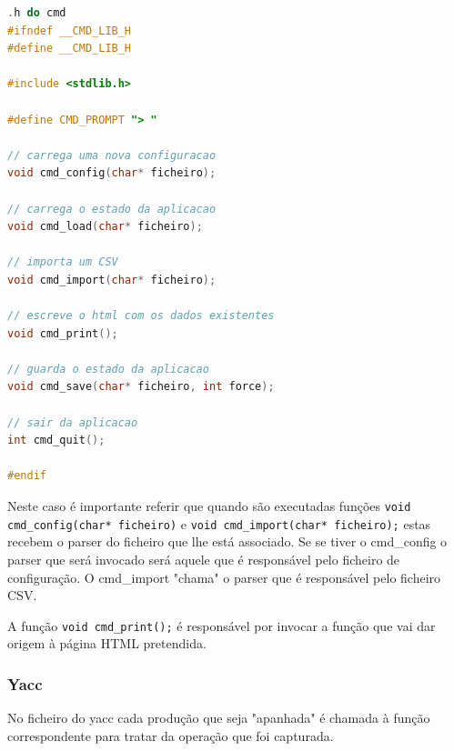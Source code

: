 \documentclass[11pt, a4paper, oneside]{article}
\begin{document}
\begin{lstlisting}[language=C, caption={Ações semânticas do módulo.}]
.h do cmd
#ifndef __CMD_LIB_H
#define __CMD_LIB_H

#include <stdlib.h>

#define CMD_PROMPT "> "

// carrega uma nova configuracao
void cmd_config(char* ficheiro);

// carrega o estado da aplicacao
void cmd_load(char* ficheiro);

// importa um CSV
void cmd_import(char* ficheiro);

// escreve o html com os dados existentes
void cmd_print();

// guarda o estado da aplicacao
void cmd_save(char* ficheiro, int force);

// sair da aplicacao
int cmd_quit();

#endif
\end{lstlisting} 

Neste caso é importante referir que quando são executadas funções \texttt{void cmd\_config(char* ficheiro)} e \texttt{void cmd\_import(char* ficheiro);} estas recebem o parser do ficheiro que lhe está associado. Se se tiver o cmd\_config o parser que será invocado será aquele que é responsável pelo ficheiro de configuração. O cmd\_import "chama" o parser que é responsável pelo ficheiro CSV.

A função \texttt{void cmd\_print();} é responsável por invocar a função que vai dar origem à página HTML pretendida.
\subsubsection{\textsf{Yacc}}

No ficheiro do \textsf{yacc} cada produção que seja "apanhada" é chamada à função correspondente para tratar da operação que foi capturada.
\end{document}
